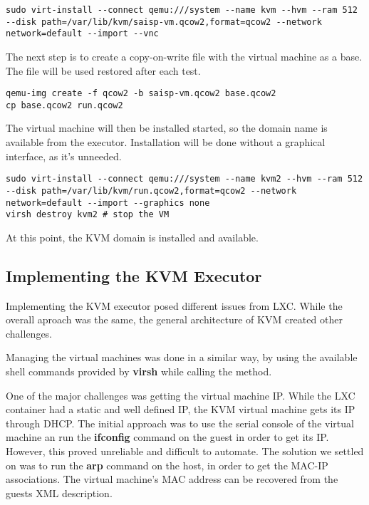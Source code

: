 \lstset{caption=Initial run of the virtual machine, label=lst:kvm-run}
\begin{lstlisting}
sudo virt-install --connect qemu:///system --name kvm --hvm --ram 512 --disk path=/var/lib/kvm/saisp-vm.qcow2,format=qcow2 --network network=default --import --vnc
\end{lstlisting}


The next step is to create a copy-on-write file with the virtual machine as a base.
The file will be used restored after each test.

\lstset{caption=Creating the Target File, label=lst:kvm-base}
\begin{lstlisting}
qemu-img create -f qcow2 -b saisp-vm.qcow2 base.qcow2
cp base.qcow2 run.qcow2
\end{lstlisting}

The virtual machine will then be installed started, so the domain name is available
from the executor. Installation will be done without a graphical interface, 
as it's unneeded.


\lstset{caption=Install the KVM Domain, label=lst:kvm-install}
\begin{lstlisting}
sudo virt-install --connect qemu:///system --name kvm2 --hvm --ram 512 --disk path=/var/lib/kvm/run.qcow2,format=qcow2 --network network=default --import --graphics none
virsh destroy kvm2 # stop the VM
\end{lstlisting}

At this point, the KVM domain is installed and available.

\subsection{Implementing the KVM Executor}
\label{sub-sec:vmc-kvm-executor}

Implementing the KVM executor posed different issues from LXC. While the
overall aproach was the same, the general architecture of KVM created other
challenges. 

Managing the virtual machines was done in a similar way, by using the available
shell commands provided by \textbf{virsh} while calling the  method.

One of the major challenges was getting the virtual machine IP. While the
LXC container had a static and well defined IP, the KVM virtual machine gets
its IP through DHCP. The initial approach was to use the serial console of 
the virtual machine an run the \textbf{ifconfig} command on the guest in order
to get its IP. However, this proved unreliable and difficult to automate. The
solution we settled on was to run the \textbf{arp} command on the host, in order
to get the MAC-IP associations. The virtual machine's MAC address can be
recovered from the guests XML description.

